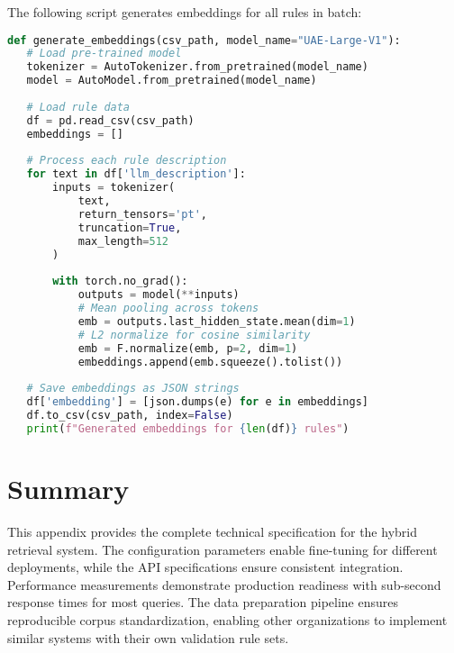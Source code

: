 The following script generates embeddings for all rules in batch:

\begin{lstlisting}[language=Python, caption={Batch embedding generation script}, label={lst:batch-embed}]
def generate_embeddings(csv_path, model_name="UAE-Large-V1"):
   # Load pre-trained model
   tokenizer = AutoTokenizer.from_pretrained(model_name)
   model = AutoModel.from_pretrained(model_name)
   
   # Load rule data
   df = pd.read_csv(csv_path)
   embeddings = []
   
   # Process each rule description
   for text in df['llm_description']:
       inputs = tokenizer(
           text, 
           return_tensors='pt',
           truncation=True, 
           max_length=512
       )
       
       with torch.no_grad():
           outputs = model(**inputs)
           # Mean pooling across tokens
           emb = outputs.last_hidden_state.mean(dim=1)
           # L2 normalize for cosine similarity
           emb = F.normalize(emb, p=2, dim=1)
           embeddings.append(emb.squeeze().tolist())
   
   # Save embeddings as JSON strings
   df['embedding'] = [json.dumps(e) for e in embeddings]
   df.to_csv(csv_path, index=False)
   print(f"Generated embeddings for {len(df)} rules")
\end{lstlisting}

\section{Summary}

This appendix provides the complete technical specification for the hybrid retrieval system. The configuration parameters enable fine-tuning for different deployments, while the API specifications ensure consistent integration. Performance measurements demonstrate production readiness with sub-second response times for most queries. The data preparation pipeline ensures reproducible corpus standardization, enabling other organizations to implement similar systems with their own validation rule sets.
